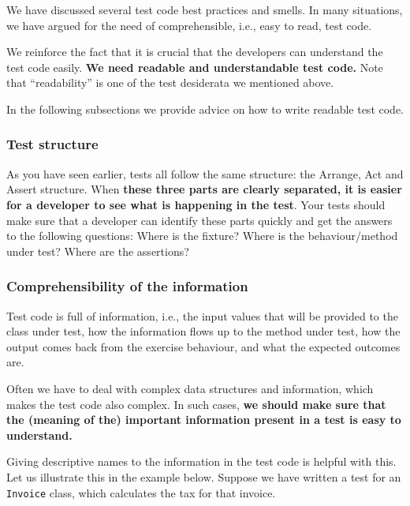 We have discussed several test code best practices and smells. In many
situations, we have argued for the need of comprehensible, i.e., easy to
read, test code.

We reinforce the fact that it is crucial that the developers can
understand the test code easily. \textbf{We need readable and
understandable test code.} Note that ``readability'' is one of the test
desiderata we mentioned above.

In the following subsections we provide advice on how to write readable
test code.

\hypertarget{test-structure}{%
\subsubsection{Test structure}\label{test-structure}}

As you have seen earlier, tests all follow the same structure: the
Arrange, Act and Assert structure. When \textbf{these three parts are
clearly separated, it is easier for a developer to see what is happening
in the test}. Your tests should make sure that a developer can identify
these parts quickly and get the answers to the following questions:
Where is the fixture? Where is the behaviour/method under test? Where
are the assertions?

\hypertarget{comprehensibility-of-the-information}{%
\subsubsection{Comprehensibility of the
information}\label{comprehensibility-of-the-information}}

Test code is full of information, i.e., the input values that will be
provided to the class under test, how the information flows up to the
method under test, how the output comes back from the exercise
behaviour, and what the expected outcomes are.

Often we have to deal with complex data structures and information,
which makes the test code also complex. In such cases, \textbf{we should
make sure that the (meaning of the) important information present in a
test is easy to understand.}

Giving descriptive names to the information in the test code is helpful
with this. Let us illustrate this in the example below. Suppose we have
written a test for an \texttt{Invoice} class, which calculates the tax
for that invoice.

